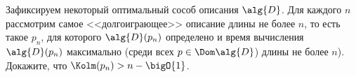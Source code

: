Зафиксируем некоторый оптимальный сособ описания $\alg{D}$. Для каждого $n$ рассмотрим самое
<<долгоиграющее>> описание длины не более $n$, то есть такое $p_n$, для которого $\alg{D}(p_n)$
определено и время вычисления $\alg{D}(p_n)$ максимально (среди всех $p \in \Dom\alg{D}$) длины не более
$n$). Докажите, что $\Kolm(p_n) > n - \bigO{1}$.
